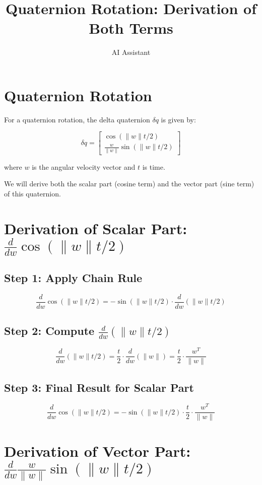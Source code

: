 \documentclass{article}
\title{Quaternion Rotation: Derivation of Both Terms}
\author{AI Assistant}
\date{}
\begin{document}
	\maketitle

	\section{Quaternion Rotation}

	For a quaternion rotation, the delta quaternion $\delta q$ is given by:

	$$\delta q = \begin{bmatrix}
		\cos(\|w\| t/2) \\
		\frac{w}{\|w\|} \sin(\|w\| t/2)
	\end{bmatrix}$$

	where $w$ is the angular velocity vector and $t$ is time.

	We will derive both the scalar part (cosine term) and the vector part (sine term) of this quaternion.

	\section{Derivation of Scalar Part: $\frac{d}{dw} \cos(\|w\| t/2)$}

	\subsection{Step 1: Apply Chain Rule}

	$$\frac{d}{dw} \cos(\|w\| t/2) = -\sin(\|w\| t/2) \cdot \frac{d}{dw}(\|w\| t/2)$$

	\subsection{Step 2: Compute $\frac{d}{dw}(\|w\| t/2)$}

	$$\frac{d}{dw}(\|w\| t/2) = \frac{t}{2} \cdot \frac{d}{dw}(\|w\|) = \frac{t}{2} \cdot \frac{w^T}{\|w\|}$$

	\subsection{Step 3: Final Result for Scalar Part}

	$$\frac{d}{dw} \cos(\|w\| t/2) = -\sin(\|w\| t/2) \cdot \frac{t}{2} \cdot \frac{w^T}{\|w\|}$$

	\section{Derivation of Vector Part: $\frac{d}{dw} \frac{w}{\|w\|} \sin(\|w\| t/2)$}
\end{document}
